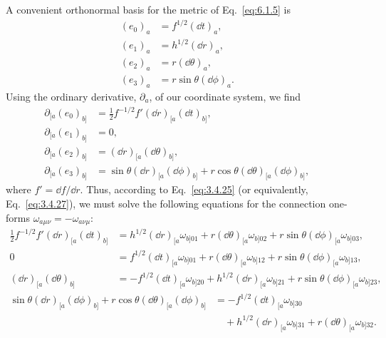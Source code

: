 A convenient orthonormal basis for the metric of Eq.~\eqref{eq:6.1.5} is
\begin{align}
  (e_0)_a&=f^{1/2}(\dd t)_a, &&\tag{6.1.6a}\label{eq:6.1.6a}\\
  (e_1)_a&=h^{1/2}(\dd r)_a, &&\tag{6.1.6b}\label{eq:6.1.6b}\\
  (e_2)_a&=r(\dd\theta)_a, &&\tag{6.1.6c}\label{eq:6.1.6c}\\
  (e_3)_a&=r\sin\theta(\dd\phi)_a. &&\tag{6.1.6d}\label{eq:6.1.6d}
\end{align}
Using the ordinary derivative, \(\partial_a\), of our coordinate system, we find
\begin{align}
  \partial_{[a}(e_0)_{b]}&=\frac12f^{-1/2}f'(\dd r)_{[a}(\dd t)_{b]},
  &&\tag{6.1.7}\label{eq:6.1.7}\\
  \partial_{[a}(e_1)_{b]}&=0,
  &&\tag{6.1.8}\label{eq:6.1.8}\\
  \partial_{[a}(e_2)_{b]}&=(\dd r)_{[a}(\dd\theta)_{b]},
  &&\tag{6.1.9}\label{eq:6.1.9}\\
  \partial_{[a}(e_3)_{b]}&=\sin\theta(\dd r)_{[a}(\dd\phi)_{b]}
     +r\cos\theta(\dd\theta)_{[a}(\dd\phi)_{b]},
  &&\tag{6.1.10}\label{eq:6.1.10}
\end{align}
where \(f'=\dd f/\dd r\). Thus, according to Eq.~\eqref{eq:3.4.25} (or
equivalently, Eq.~\eqref{eq:3.4.27}), we must solve the following equations for
the connection one-forms \(\omega_{a\mu\nu}=-\omega_{a\nu\mu}\):
\begin{align}
  \frac12f^{-1/2}f'(\dd r)_{[a}(\dd t)_{b]}
    &=h^{1/2}(\dd r)_{[a}\omega_{b]01}
      +r(\dd\theta)_{[a}\omega_{b]02}
      +r\sin\theta(\dd\phi)_{[a}\omega_{b]03},
  &&\tag{6.1.11}\label{eq:6.1.11}\\
  0&=f^{1/2}(\dd t)_{[a}\omega_{b]01}
      +r(\dd\theta)_{[a}\omega_{b]12}
      +r\sin\theta(\dd\phi)_{[a}\omega_{b]13},
  &&\tag{6.1.12}\label{eq:6.1.12}\\
  (\dd r)_{[a}(\dd\theta)_{b]}
    &=-f^{1/2}(\dd t)_{[a}\omega_{b]20}
      +h^{1/2}(\dd r)_{[a}\omega_{b]21}
      +r\sin\theta(\dd\phi)_{[a}\omega_{b]23},
  &&\tag{6.1.13}\label{eq:6.1.13}
\end{align}
\begin{equation}
  \begin{aligned}
  \sin\theta(\dd r)_{[a}(\dd\phi)_{b]}
    +r\cos\theta(\dd\theta)_{[a}(\dd\phi)_{b]}
    &=-f^{1/2}(\dd t)_{[a}\omega_{b]30}\\
    &\quad{}+h^{1/2}(\dd r)_{[a}\omega_{b]31}
      +r(\dd\theta)_{[a}\omega_{b]32}.
  \end{aligned}
  \tag{6.1.14}\label{eq:6.1.14}
\end{equation}
